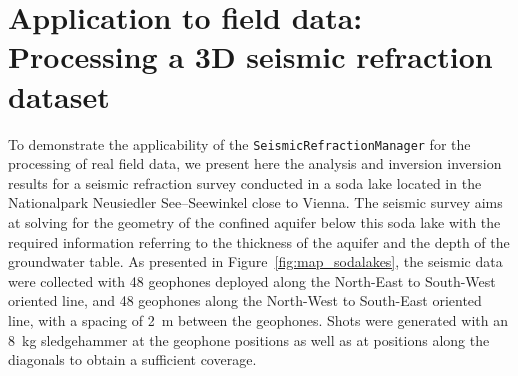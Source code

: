 \documentclass[a4paper,fleqn]{cas-sc}
\begin{document}
\section{Application to field data: Processing a 3D seismic refraction dataset}

To demonstrate the applicability of the  \texttt{SeismicRefractionManager} for the processing of real field data, we present here the analysis and inversion inversion results for a seismic refraction survey
conducted in a soda lake located in the Nationalpark Neusiedler See--Seewinkel close to Vienna.
The seismic survey aims at solving for the geometry of the confined aquifer below this soda lake with the required information referring to the thickness of the aquifer and the depth of the groundwater table.
As presented in Figure~\ref{fig:map_sodalakes}, the seismic data were collected with 48 geophones deployed along the North-East to South-West oriented line, and 48 geophones along the North-West to South-East oriented line, with a spacing of \qty{2}{m} between the geophones. Shots were generated with an \qty{8}{kg} sledgehammer at the geophone positions as well as at positions along the diagonals to obtain a sufficient coverage.
\end{document}
